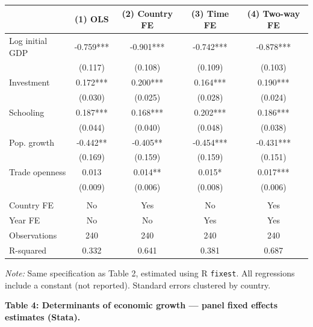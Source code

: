 \documentclass[
  letterpaper,
  DIV=11,
  numbers=noendperiod]{scrartcl}
\newcounter{none} %
\begin{document}
{\def\LTcaptype{none} %
\begin{longtable}[]{@{}lcccc@{}}
\toprule\noalign{}
& (1) OLS & (2) Country FE & (3) Time FE & (4) Two-way FE \\
\midrule\noalign{}
\endhead
\bottomrule\noalign{}
\endlastfoot
Log initial GDP & -0.759*** & -0.901*** & -0.742*** & -0.878*** \\
& (0.117) & (0.108) & (0.109) & (0.103) \\
Investment & 0.172*** & 0.200*** & 0.164*** & 0.190*** \\
& (0.030) & (0.025) & (0.028) & (0.024) \\
Schooling & 0.187*** & 0.168*** & 0.202*** & 0.186*** \\
& (0.044) & (0.040) & (0.048) & (0.038) \\
Pop. growth & -0.442** & -0.405** & -0.454*** & -0.431*** \\
& (0.169) & (0.159) & (0.159) & (0.151) \\
Trade openness & 0.013 & 0.014** & 0.015* & 0.017*** \\
& (0.009) & (0.006) & (0.008) & (0.006) \\
& & & & \\
Country FE & No & Yes & No & Yes \\
Year FE & No & No & Yes & Yes \\
Observations & 240 & 240 & 240 & 240 \\
R-squared & 0.332 & 0.641 & 0.381 & 0.687 \\
\end{longtable}
}

\emph{Note:} Same specification as Table 2, estimated using R
\texttt{fixest}. All regressions include a constant (not reported).
Standard errors clustered by country.

\textbf{Table 4: Determinants of economic growth --- panel fixed effects
estimates (Stata).}
\end{document}
